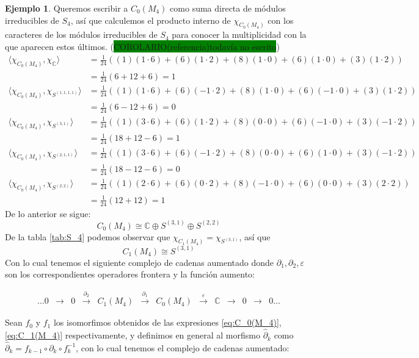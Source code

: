 \documentclass[12pt]{book}
\theoremstyle{definition}
\newtheorem{example}[theorem]{Ejemplo}
\newcounter{in}
\newcounter{ini}
\begin{document}
\begin{example}
Queremos escribir a $C_{0}(M_{4})$ como suma directa de módulos
irreducibles de $S_{4}$, así que calculemos el producto interno de $\chi_{C_{0}(M_{4})}$ con los
caracteres de los módulos irreducibles de $S_{4}$ para conocer la
multiplicidad con la que aparecen estos últimos.
(\setlength{\fboxsep}{0pt}\colorbox{green}{COROLARIO(referencia)todavía
no escrito})
\begin{align*}
  \langle\chi_{C_{0}(M_{4})},\chi_{\mathbb{C}}\rangle &=\frac{1}{24}((1)(1\cdot6)+(6)(1\cdot2)+(8)(1\cdot0)+(6)(1\cdot0)+(3)(1\cdot2))\\
  &=\frac{1}{24}(6+12+6)=1\\
  \langle\chi_{C_{0}(M_{4})},\chi_{S^{(1,1,1,1)}}\rangle &=\frac{1}{24}((1)(1\cdot6)+(6)(-1\cdot2)+(8)(1\cdot0)+(6)(-1\cdot0)+(3)(1\cdot2))\\
  &=\frac{1}{24}(6-12+6)=0\\
  \langle\chi_{C_{0}(M_{4})},\chi_{S^{(3,1)}}\rangle &=\frac{1}{24}((1)(3\cdot6)+(6)(1\cdot2)+(8)(0\cdot0)+(6)(-1\cdot0)+(3)(-1\cdot2))\\
  &=\frac{1}{24}(18+12-6)=1\\
  \langle\chi_{C_{0}(M_{4})},\chi_{S^{(2,1,1)}}\rangle &=\frac{1}{24}((1)(3\cdot6)+(6)(-1\cdot2)+(8)(0\cdot0)+(6)(1\cdot0)+(3)(-1\cdot2))\\
  &=\frac{1}{24}(18-12-6)=0\\
  \langle\chi_{C_{0}(M_{4})},\chi_{S^{(2,2)}}\rangle &=\frac{1}{24}((1)(2\cdot6)+(6)(0\cdot2)+(8)(-1\cdot0)+(6)(0\cdot0)+(3)(2\cdot2))\\
  &=\frac{1}{24}(12+12)=1
\end{align*}
De lo anterior se sigue:
\begin{equation}
\label{eq:C_0(M_4)}
C_{0}(M_{4})\cong \mathbb{C}\oplus S^{(3,1)}\oplus S^{(2,2)}
\end{equation}
De la tabla \ref{tab:S_4}
podemos observar que $\chi_{C_{1}(M_{4})}=\chi_{S^{(3,1)}}$, así que  
\begin{equation}
\label{eq:C_1(M_4)}
C_{1}(M_{4})\cong S^{(3,1)}
\end{equation}
Con lo cual tenemos el siguiente complejo de cadenas aumentado
donde $\partial_{1},\partial_{2},\varepsilon$ son los correspondientes
operadores frontera y la función aumento:

\begin{small}
  \[
    \begin{array}{ccccccccccccc}
      \dots 0 & \rightarrow & 0 &
      \stackrel{\partial_{2}}{\rightarrow} & C_{1}(M_{4}) &
      \stackrel{\partial_{1}}{\rightarrow} & C_{0}(M_{4}) & \stackrel{\varepsilon}{\rightarrow} &
      \mathbb{C} & \rightarrow  & 0 & \rightarrow & 0 \dots
    \end{array} 
    \]
  \end{small}
Sean $f_{0}$ y $f_{1}$ los isomorfimos obtenidos de las expresiones
\ref{eq:C_0(M_4)}, \ref{eq:C_1(M_4)} respectivamente, y definimos en
general al morfismo $\widehat\partial_{k}$ como
$\widehat\partial_{k}=f_{k-1}\circ \partial_{k}\circ f^{-1}_{k}$, con
lo cual tenemos el complejo de cadenas aumentado: 


\end{example}
\end{document}
